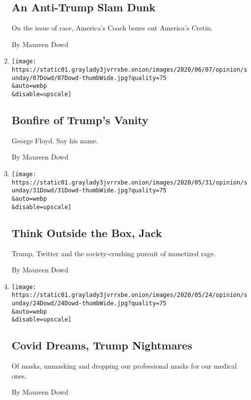 \begin{enumerate}
  \hypertarget{an-anti-trump-slam-dunk}{%
  \subsection{An Anti-Trump Slam Dunk}\label{an-anti-trump-slam-dunk}}

  On the issue of race, America's Coach boxes out America's Cretin.

  By Maureen Dowd
\item
  \href{/2020/06/06/opinion/trump-washington-monuments-george-floyd-protests.html}{}

  \texttt{[image: https://static01.graylady3jvrrxbe.onion/images/2020/06/07/opinion/sunday/07Dowd/07Dowd-thumbWide.jpg?quality=75\\\&auto=webp\\\&disable=upscale]}

  \hypertarget{bonfire-of-trumps-vanity}{%
  \subsection{Bonfire of Trump's
  Vanity}\label{bonfire-of-trumps-vanity}}

  George Floyd. Say his name.

  By Maureen Dowd
\item
  \href{/2020/05/30/opinion/sunday/trump-twitter-jack-dorsey.html}{}

  \texttt{[image: https://static01.graylady3jvrrxbe.onion/images/2020/05/31/opinion/sunday/31Dowd/31Dowd-thumbWide.jpg?quality=75\\\&auto=webp\\\&disable=upscale]}

  \hypertarget{think-outside-the-box-jack}{%
  \subsection{Think Outside the Box,
  Jack}\label{think-outside-the-box-jack}}

  Trump, Twitter and the society-crushing pursuit of monetized rage.

  By Maureen Dowd
\item
  \href{/2020/05/23/opinion/sunday/trump-mask-coronavirus.html}{}

  \texttt{[image: https://static01.graylady3jvrrxbe.onion/images/2020/05/24/opinion/sunday/24Dowd/24Dowd-thumbWide.jpg?quality=75\\\&auto=webp\\\&disable=upscale]}

  \hypertarget{covid-dreams-trump-nightmares}{%
  \subsection{Covid Dreams, Trump
  Nightmares}\label{covid-dreams-trump-nightmares}}

  Of masks, unmasking and dropping our professional masks for our
  medical ones.

  By Maureen Dowd
\end{enumerate}

